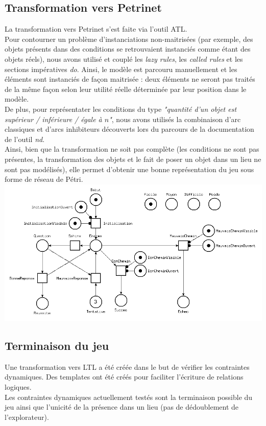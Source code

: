 \documentclass[12pt]{article}
\begin{document}
\subsection{Transformation vers Petrinet}
La transformation vers Petrinet s'est faite via l'outil ATL.\\
Pour contourner un problème d'instanciations non-maitrisées (par exemple, des objets présents dans des conditions se retrouvaient instanciés comme étant des objets réels), nous avons utilisé et couplé les \textit{lazy rules}, les \textit{called rules} et les sections impératives \textit{do}. Ainsi, le modèle est parcouru manuellement et les éléments sont instanciés de façon maitrisée : deux éléments ne seront pas traités de la même façon selon leur utilité réelle déterminée par leur position dans le modèle.\\
De plus, pour représentater les conditions du type \textit{"quantité d'un objet est supérieur / inférieure / égale à $n$"}, nous avons utilisés la combinaison d'arc classiques et d'arcs inhibiteurs découverts lors du parcours de la documentation de l'outil \textit{nd}.\\
Ainsi, bien que la transformation ne soit pas complète (les conditions ne sont pas présentes, la transformation des objets et le fait de poser un objet dans un lieu ne sont pas modélisés), elle permet d'obtenir une bonne représentation du jeu sous forme de réseau de Pétri.
\newline\newline
\includegraphics[width=\textwidth]{images/petrinet}
\newline\newline

\subsection{Terminaison du jeu}
Une transformation vers LTL a été créée dans le but de vérifier les contraintes dynamiques. Des templates ont été créés pour faciliter l'écriture de relations logiques.\\
Les contraintes dynamiques actuellement testés sont la terminaison possible du jeu ainsi que l'unicité de la présence dans un lieu (pas de dédoublement de l'explorateur).
\end{document}

